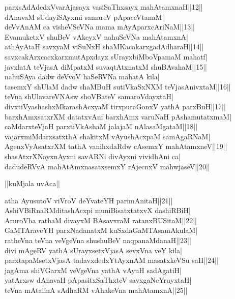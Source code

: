 \documentclass{article}
\begin{document}
parxsAdAdedxVvarAjasayx vasiSaThxsayx mahAtamxnaH||12||\\
dAnavaM sUdayiSAyxmi samareV pApaceVtanaM|\\
deVvAnAM ca visheVSeVNa mama mAyAparxcAriNaM||13||\\
EvamuketxV shuBeV vAkeyxV nahuSeVNa mahAtamxnA|\\
athAyAtaH savxyaM viSuNxH shaMKacakarxgadAdharaH||14||\\
savxcakArxcacxkarxmutApxdayx sUrayxbiMboVpamaM mahatf|\\
javxlatA teVjasA diMpatxM suvaqtAtxnatxM shuBAvahaM||15||\\
nahuSAya dadw deVvoV haSeRVNa mahatA kila|\\
tasemxY shUlaM dadw shaMBuH sutiVkaSxNXM teVjasAnivxtaM||16||\\
teVna shUlavareVNAsw shoVBateV samaroVdayxtaH|\\
divxtiVyashashxMkarashAcxyaM tirxpuraGonxV yathA parxBuH||17||\\
barxhAmxsatxrXM datatxvAnf barxhAmx varuNaH pAshamutatxmaM|\\
caMdarxteVjaH parxtiVkAshaM jalajaM nAlasaMgataM||18||\\
vajarxmiMdarxsatxthA shakitxM vAyushAcxpaM samAgaRNaM|\\
AgenxVyAsatxrXM tathA vanihxdaRdw cAsemxY mahAtamxneV||19||\\
shasAtxrXNayxnAyxni savARNi divAyxni vividhAni ca|\\
dadudeRVvA mahAtAmxnasatxsemxY rAjecnxV mahwjaseV||20||\\

\begin{center}
||kuMjala uvAca||
\end{center}

atha AyusutoV viVroV deYvateYH parimAnitaH||21||\\
AshiVBiRnaRMditashAcxpi muniBisatxtatxvX dashiRBiH|\\
AruroVha rathaM divayxM BAsavxraM ratanxBUSitaM||22||\\
GaMTAraveYH parxNadanatxM kuSxdaGaMTAsamAkulaM|\\
ratheVna teVna veVgeVna shushuBeV naqpanaMdanaH||23||\\
divi mAgeRV yathA sUrayxsetxVjasA sevxVna veY kila|\\
parxtapaMsetxVjasA tadavxdedxYtAyxnAM masatxkeVSu saH||24||\\
jagAma shiVGarxM veVgeVna yathA vAyuH sadAgatiH|\\
yatArxsw dAnavaH pApasitxSaThxteV savxgaNeYruyxtaH|\\
teVna mAtalinA sAdhaRM vAhakeVna mahAtamxnA||25||
\end{document}
